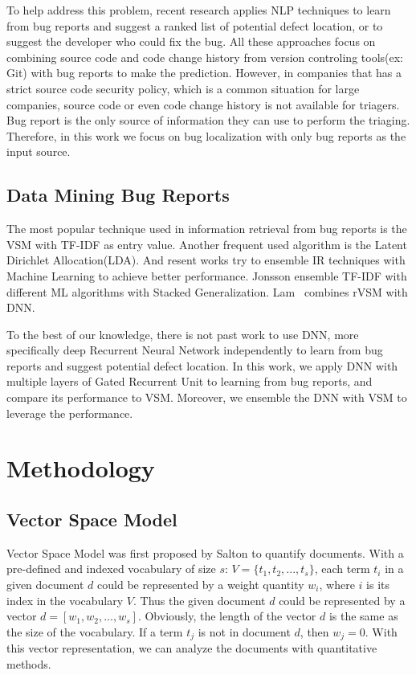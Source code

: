 To help address this problem, recent research applies NLP techniques to learn from bug reports and suggest a ranked list of potential defect location\cite{gay2009use}\cite{lam2017bug}\cite{nguyen2011topic}\cite{zhou2012should}\cite{saha2013improving}\cite{shokripour2013so}, or to suggest the developer who could fix the bug\cite{anvik2011reducing}\cite{bhattacharya2010fine}\cite{xuan2012developer}\cite{jonsson2016automated}.
All these approaches focus on combining source code and code change history from version controling tools(ex: Git)  with bug reports to make the prediction.
However, in companies that has a strict source code security policy, which is a common situation for large companies, source code or even code change history is not available for triagers. 
Bug report is the only source of information they can use to perform the triaging.   
Therefore, in this work we focus on bug localization with only bug reports as the input source.


\subsection{Data Mining Bug Reports}
The most popular technique used in information retrieval from bug reports is the VSM with TF-IDF as entry value\cite{gay2009use}\cite{zhou2012should}. 
Another frequent used algorithm is the Latent Dirichlet Allocation(LDA)\cite{nguyen2011topic}.
And resent works try to ensemble IR techniques with Machine Learning to achieve better performance\cite{jonsson2016automated}\cite{lam2017bug}.
Jonsson \etal \cite{jonsson2016automated} ensemble TF-IDF with different ML algorithms with Stacked Generalization. 
Lam \etal\ \cite{lam2017bug}combines rVSM with DNN.

To the best of our knowledge, there is not past work to use DNN, more specifically deep Recurrent Neural Network independently to learn from bug reports and suggest potential defect location.
In this work, we apply DNN with multiple layers of Gated Recurrent Unit to learning from bug reports, and compare its performance to VSM.
Moreover, we ensemble the DNN with VSM to leverage the performance.

\section{Methodology}

\subsection{Vector Space Model}
Vector Space Model was first proposed by Salton \etal\cite{salton1975vector} to quantify documents.
With a pre-defined and indexed vocabulary of size $s$: $V = \{t_1, t_2,...,t_s\}$, 
each term $t_i$ in a given document $d$ could be represented by a weight quantity $w_i$, where $i$ is its index in the vocabulary $V$.
Thus the given document $d$ could be represented by a vector $d=[w_1,w_2,...,w_s]$.
Obviously, the length of the vector $d$ is the same as the size of the vocabulary.
If a term $t_j$ is not in document $d$, then $w_j = 0$.   
With this vector representation, we can analyze the documents with quantitative methods.

